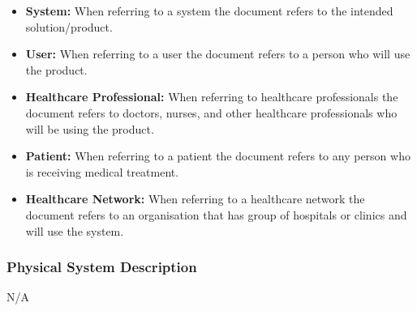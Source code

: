 \documentclass[12pt]{article}
\begin{document}
\begin{itemize}
  \item \textbf{System:} When referring to a system the document refers to the intended solution/product.
  \item \textbf{User:} When referring to a user the document refers to a person who will use the product.
  \item \textbf{Healthcare Professional:} When referring to healthcare professionals the document refers to doctors, nurses, and other healthcare professionals who will be using the product.
  \item \textbf{Patient:} When referring to a patient the document refers to any person who is receiving medical treatment.
  \item \textbf{Healthcare Network:} When referring to a healthcare network the document refers to an organisation that has group of hospitals or clinics and will use the system.
\end{itemize}


\subsubsection{Physical System Description} \label{sec_phySystDescrip}
N/A
\end{document}
